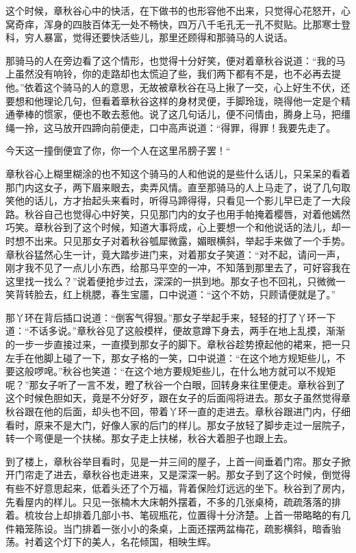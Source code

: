 \documentclass[12pt,UTF8]{ctexbook}
\begin{document}
{{{这个时候，章秋谷心中的快活，在下做书的也形容他不出来，只觉得心花怒开，心窝奇痒，浑身的四肢百体无一处不畅快，四万八千毛孔无一孔不熨贴。比那寒士登科，穷人暴富，觉得还要快活些儿，那里还顾得和那骑马的人说话。

那骑马的人在旁边看了这个情形，也觉得十分好笑，便对着章秋谷说道：“我的马上虽然没有响铃，你的走路却也太慌迫了些，我们两下都有不是，也不必再去提他。”依着这个骑马的人的意思，无故被章秋谷在马上揪了一交，心上好生不伏，还要想和他理论几句，但看着章秋谷这样的身材灵便，手脚玲珑，晓得他一定是个精通拳棒的惯家，便也不敢去惹他。说了这几句话儿，便不问情由，腾身上马，把缰绳一拎，这马放开四蹄向前便走，口中高声说道：“得罪，得罪！我要先走了。

今天这一撞倒便宜了你，你一个人在这里吊膀子罢！“

章秋谷心上糊里糊涂的也不知这个骑马的人和他说的是些什么话儿，只呆呆的看着那门内这女子，两下眉来眼去，卖弄风情。直至那骑马的人上马走了，说了几句取笑他的话儿，方才抬起头来看时，听得马蹄得得，只看见一个影儿早已走了一大段路。秋谷自己也觉得心中好笑，只见那门内的女子也用手帕掩着樱唇，对着他嫣然巧笑。章秋谷到了这个时候，知道大事将成，心上要想一个和他说话的法儿，却一时想不出来。只见那女子对着秋谷瓠犀微露，媚眼横斜，举起手来做了一个手势。章秋谷猛然心生一计，竟大踏步进门来，对着那女子笑道：“对不起，请问一声，刚才我不见了一点儿小东西，给那马平空的一冲，不知落到那里去了，可好容我在这里找一找么？”说着便抢步过去，深深的一拱到地。那女子也不回礼，只微微一笑背转脸去，红上桃腮，春生宝靥，口中说道：“这个不妨，只顾请便就是了。”

那丫环在背后插口说道：“倒客气得狠。”那女子举起手来，轻轻的打了丫环一下道：“不话多说。”章秋谷见了这般模样，便故意蹲下身去，两手在地上乱摸，渐渐的一步一步直接过来，一直摸到那女子的脚下。章秋谷趁势撩起他的裙来，把一只左手在他脚上碰了一下，那女子格的一笑，口中说道：“在这个地方规矩些儿，不要这般啰唣。”秋谷也笑道：“在这个地方要规矩些儿，在什么地方就可以不规矩呢？”那女子听了一言不发，瞪了秋谷一个白眼，回转身来往里便走。章秋谷到了这个时候色胆如天，竟是不分好歹，跟在女子的后面闯将进去。那女子虽然觉得章秋谷跟在他的后面，却头也不回，带着丫环一直的走进去。章秋谷跟进门内，仔细看时，原来不是大门，好像人家的后门的样儿。那女子放轻了脚步走过一层院子，转一个弯便是一个扶梯。那女子走上扶梯，秋谷大着胆子也跟上去。

到了楼上，章秋谷举目看时，见是一并三间的屋子，上首一间垂着门帘。那女子掀开门帘走了进去，章秋谷也走进来，又是深深一躬。那女子到了这个时候，倒觉得有些不好意思起来，低着头还了个万福，背着保险灯远远的坐下。秋谷到了房内，先看屋内的样儿。只见一张楠木大床朝外摆着，不多的几张桌椅，疏疏落落的排着。梳妆台上却排着几部小书、笔砚瓶花，位置得十分济楚。上首一带略略的有几件箱笼陈设。当门排着一张小小的条桌，上面还摆两盆梅花，疏影横斜，暗香骀荡。衬着这个灯下的美人，名花倾国，相映生辉。

}}}
\end{document}

